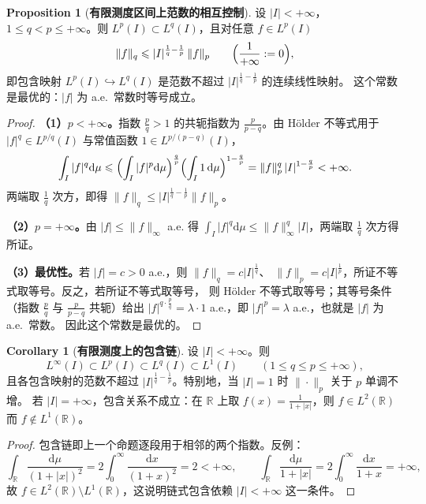 \documentclass[oneside]{book}
\theoremstyle{definition}
\newcommand{\R}{\mathbb{R}}
\newcommand{\dd}{\mathrm{d}}
\theoremstyle{definition}
\newtheorem{proposition}{Proposition}[section]
\newtheorem{corollary}{Corollary}[section]
\begin{document}
	\begin{proposition}[\bfseries{有限测度区间上范数的相互控制}]
		设 $|I|<+\infty$，$1\leqslant q<p\leqslant+\infty$。则 $L^p(I)\subset L^q(I)$，且对任意 $f\in L^p(I)$
		\[
		\|f\|_q\leqslant|I|^{\frac1q-\frac1p}\,\|f\|_p
		\qquad\Bigl(\frac1{+\infty}:=0\Bigr),
		\]
		即包含映射 $L^p(I)\hookrightarrow L^q(I)$ 是范数不超过 $|I|^{\frac1q-\frac1p}$ 的连续线性映射。
		这个常数是最优的：$|f|$ 为 a.e.\ 常数时等号成立。
	\end{proposition}
	
	\begin{proof}
		\textbf{（1）$p<+\infty$。}指数 $\frac pq>1$ 的共轭指数为 $\frac{p}{p-q}$。由 Hölder 不等式用于
		$|f|^q\in L^{p/q}(I)$ 与常值函数 $1\in L^{p/(p-q)}(I)$，
		\[
		\int_I|f|^q\dd\mu\leqslant\Bigl(\int_I|f|^p\dd\mu\Bigr)^{\frac qp}
		\Bigl(\int_I1\,\dd\mu\Bigr)^{1-\frac qp}
		=\|f\|_p^q\,|I|^{1-\frac qp}<+\infty .
		\]
		两端取 $\frac1q$ 次方，即得 $\|f\|_q\leqslant|I|^{\frac1q-\frac1p}\|f\|_p$。
		
		\textbf{（2）$p=+\infty$。}由 $|f|\leqslant\|f\|_\infty$ a.e. 得
		$\int_I|f|^q\dd\mu\leqslant\|f\|_\infty^q|I|$，两端取 $\frac1q$ 次方得所证。
		
		\textbf{（3）最优性。}若 $|f|=c>0$ a.e.，则 $\|f\|_q=c|I|^{\frac1q}$、
		$\|f\|_p=c|I|^{\frac1p}$，所证不等式取等号。反之，若所证不等式取等号，
		则 Hölder 不等式取等号；其等号条件（指数 $\frac pq$ 与 $\frac{p}{p-q}$ 共轭）给出
		$|f|^{q\cdot\frac pq}=\lambda\cdot1$ a.e.，即 $|f|^p=\lambda$ a.e.，也就是 $|f|$ 为 a.e.\ 常数。
		因此这个常数是最优的。
	\end{proof}
	
	\begin{corollary}[\bfseries{有限测度上的包含链}]
		设 $|I|<+\infty$。则
		\[
		L^\infty(I)\subset L^p(I)\subset L^q(I)\subset L^1(I)\qquad(1\leqslant q\leqslant p\leqslant+\infty),
		\]
		且各包含映射的范数不超过 $|I|^{\frac1q-\frac1p}$。特别地，当 $|I|=1$ 时 $\|\cdot\|_p$ 关于 $p$ 单调不增。
		若 $|I|=+\infty$，包含关系不成立：在 $\R$ 上取 $f(x)=\frac1{1+|x|}$，则 $f\in L^2(\R)$ 而 $f\notin L^1(\R)$。
	\end{corollary}
	
	\begin{proof}
		包含链即上一个命题逐段用于相邻的两个指数。反例：
		\[
		\int_\R\frac{\dd\mu}{(1+|x|)^2}=2\int_0^\infty\frac{\dd x}{(1+x)^2}=2<+\infty,
		\qquad
		\int_\R\frac{\dd\mu}{1+|x|}=2\int_0^\infty\frac{\dd x}{1+x}=+\infty,
		\]
		故 $f\in L^2(\R)\setminus L^1(\R)$，这说明链式包含依赖 $|I|<+\infty$ 这一条件。
	\end{proof}
	
\end{document}
